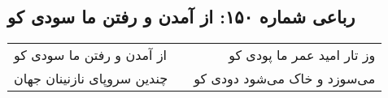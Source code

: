 \begin{center}
\section*{رباعی شماره ۱۵۰: از آمدن و رفتن ما سودی کو}
\label{sec:sh150}
\begin{longtable}{l p{0.5cm} r}
از آمدن و رفتن ما سودی کو
&&
وز تار امید عمر ما پودی کو
\\
چندین سروپای نازنینان جهان
&&
می‌سوزد و خاک می‌شود دودی کو
\\
\end{longtable}
\end{center}

